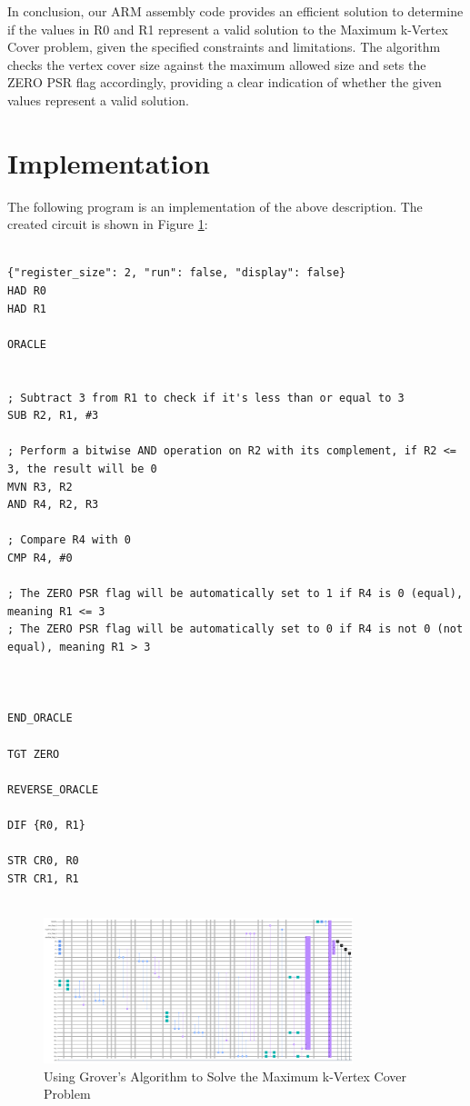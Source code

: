 In conclusion, our ARM assembly code provides an efficient solution to determine if the values in R0 and R1 represent a valid solution to the Maximum k-Vertex Cover problem, given the specified constraints and limitations. The algorithm checks the vertex cover size against the maximum allowed size and sets the ZERO PSR flag accordingly, providing a clear indication of whether the given values represent a valid solution.



\section{Implementation}

The following program is an implementation of the above description. The created circuit is shown in Figure \ref{fig:Maximum_k-Vertex_Cover}:

\begin{lstlisting}

{"register_size": 2, "run": false, "display": false}
HAD R0
HAD R1

ORACLE


; Subtract 3 from R1 to check if it's less than or equal to 3
SUB R2, R1, #3

; Perform a bitwise AND operation on R2 with its complement, if R2 <= 3, the result will be 0
MVN R3, R2
AND R4, R2, R3

; Compare R4 with 0
CMP R4, #0

; The ZERO PSR flag will be automatically set to 1 if R4 is 0 (equal), meaning R1 <= 3
; The ZERO PSR flag will be automatically set to 0 if R4 is not 0 (not equal), meaning R1 > 3



END_ORACLE

TGT ZERO

REVERSE_ORACLE

DIF {R0, R1}

STR CR0, R0
STR CR1, R1


\end{lstlisting}

\begin{figure}[htp]
    \centering
    \includegraphics[width=9cm]{Figures/Maximum_k-Vertex_Cover_circuit.png}
    \caption{Using Grover's Algorithm to Solve the Maximum k-Vertex Cover Problem}
    \label{fig:Maximum_k-Vertex_Cover}
\end{figure}

